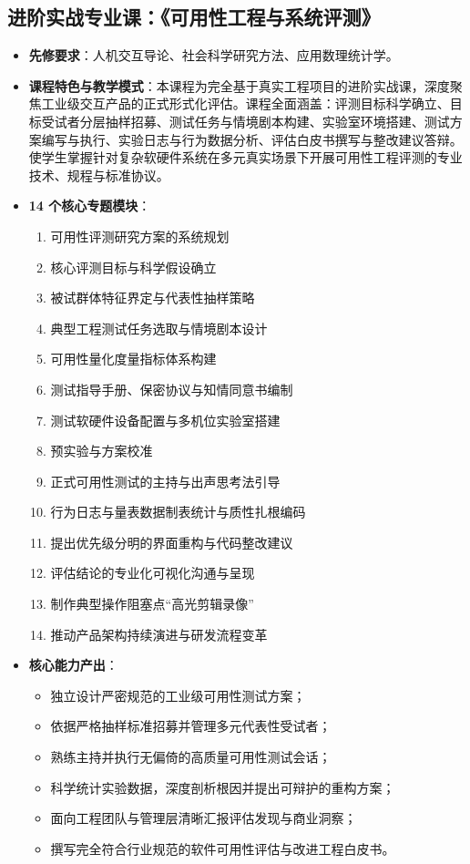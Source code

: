 \subsection{进阶实战专业课：《可用性工程与系统评测》}
\begin{itemize}
    \item \textbf{先修要求}：人机交互导论、社会科学研究方法、应用数理统计学。
    \item \textbf{课程特色与教学模式}：本课程为完全基于真实工程项目的进阶实战课，深度聚焦工业级交互产品的正式形式化评估。课程全面涵盖：评测目标科学确立、目标受试者分层抽样招募、测试任务与情境剧本构建、实验室环境搭建、测试方案编写与执行、实验日志与行为数据分析、评估白皮书撰写与整改建议答辩。使学生掌握针对复杂软硬件系统在多元真实场景下开展可用性工程评测的专业技术、规程与标准协议。
    \item \textbf{14 个核心专题模块}：
    \begin{enumerate}
        \item 可用性评测研究方案的系统规划
        \item 核心评测目标与科学假设确立
        \item 被试群体特征界定与代表性抽样策略
        \item 典型工程测试任务选取与情境剧本设计
        \item 可用性量化度量指标体系构建
        \item 测试指导手册、保密协议与知情同意书编制
        \item 测试软硬件设备配置与多机位实验室搭建
        \item 预实验与方案校准
        \item 正式可用性测试的主持与出声思考法引导
        \item 行为日志与量表数据制表统计与质性扎根编码
        \item 提出优先级分明的界面重构与代码整改建议
        \item 评估结论的专业化可视化沟通与呈现
        \item 制作典型操作阻塞点“高光剪辑录像”
        \item 推动产品架构持续演进与研发流程变革
    \end{enumerate}
    \item \textbf{核心能力产出}：
    \begin{itemize}
        \item 独立设计严密规范的工业级可用性测试方案；
        \item 依据严格抽样标准招募并管理多元代表性受试者；
        \item 熟练主持并执行无偏倚的高质量可用性测试会话；
        \item 科学统计实验数据，深度剖析根因并提出可辩护的重构方案；
        \item 面向工程团队与管理层清晰汇报评估发现与商业洞察；
        \item 撰写完全符合行业规范的软件可用性评估与改进工程白皮书。
    \end{itemize}
\end{itemize}

